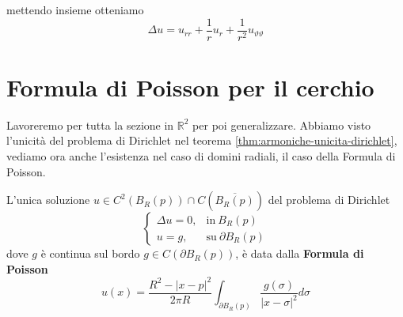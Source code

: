 \documentclass[10pt,a4paper,twoside,openright]{book}
\begin{document}
mettendo insieme otteniamo
\begin{equation*}
\Delta u=u_{rr} +\frac{1}{r} u_{r} +\frac{1}{r^{2}} u_{\vartheta \vartheta }
\end{equation*}
\section{Formula di Poisson per il cerchio} %
Lavoreremo per tutta la sezione in $\displaystyle \mathbb{R}^{2}$ per poi generalizzare.
Abbiamo visto l'unicità del problema di Dirichlet nel teorema \ref{thm:armoniche-unicita-dirichlet}, vediamo ora anche l'esistenza nel caso di domini radiali, il caso della Formula di Poisson.
\begin{theorem}
L'unica soluzione $u\in C^{2}(B_{R}(p)) \cap C\left(\overline{B_{R}(p)}\right)$ del problema di Dirichlet
\begin{equation*}
\begin{cases}
\Delta u=0, & \text{in} \ B_{R}(p)\\
u=g, & \text{su} \ \partial B_{R}(p)
\end{cases}
\end{equation*}
dove $g$ è continua sul bordo $g\in C( \partial B_{R}(p))$, è data dalla \textbf{Formula di Poisson}
\begin{equation*}
u(x) =\frac{R^{2} -| x-p| ^{2}}{2\pi R}\int _{\partial B_{R}(p)}\frac{g(\sigma)}{| x-\sigma | ^{2}} d\sigma 
\end{equation*}
\end{theorem}
\end{document}
